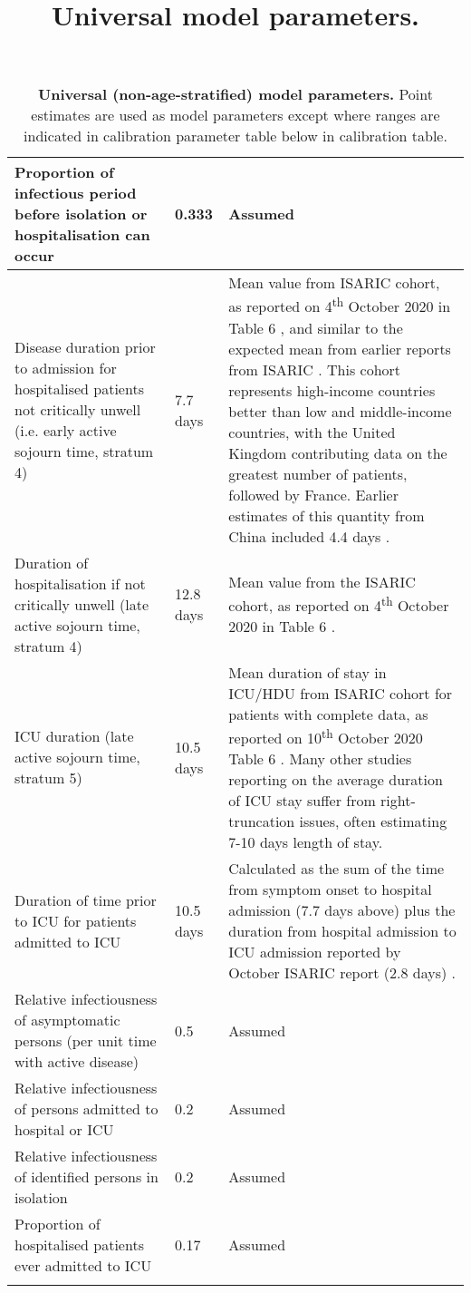 \begin{longtable}[ht]{| >{\raggedright}p{4cm} | >{\raggedright}p{3cm} | p{6.8cm} |}
    \hline
    Proportion of infectious period before isolation or hospitalisation can occur & 
    0.333 &
    Assumed \\
    \hline
    Disease duration prior to admission for hospitalised patients not critically unwell (i.e. early active sojourn time, stratum 4) &
    7.7 days &
    Mean value from ISARIC cohort, as reported on 4\textsuperscript{th} October 2020 in Table 6 \cite{RN22}, and similar to the expected mean from earlier reports from ISARIC \cite{RN16}. This cohort represents high-income countries better than low and middle-income countries, with the United Kingdom contributing data on the greatest number of patients, followed by France. Earlier estimates of this quantity from China included 4.4 days \cite{RN7}. \\
    \hline
    Duration of hospitalisation if not critically unwell (late active sojourn time, stratum 4) &
    12.8 days &
    Mean value from the ISARIC cohort, as reported on 4\textsuperscript{th} October 2020 in Table 6 \cite{RN22}. \\
    \hline
    ICU duration (late active sojourn time, stratum 5) & 10.5 days &
    Mean duration of stay in ICU/HDU from ISARIC cohort for patients with complete data, as reported on 10\textsuperscript{th} October 2020 Table 6 \cite{RN22}. Many other studies reporting on the average duration of ICU stay suffer from right-truncation issues, often estimating 7-10 days length of stay. \\
    \hline    
    Duration of time prior to ICU for patients admitted to ICU & 
    10.5 days & 
    Calculated as the sum of the time from symptom onset to hospital admission (7.7 days above) plus the duration from hospital admission to ICU admission reported by October ISARIC report (2.8 days) \cite{RN22}. \\
    \hline
    Relative infectiousness of asymptomatic persons (per unit time with active disease) & 0.5 & Assumed \\
    \hline
    Relative infectiousness of persons admitted to hospital or ICU & 0.2 & Assumed \\
    \hline
    Relative infectiousness of identified persons in isolation & 0.2 & Assumed \\
    \hline
    Proportion of hospitalised patients ever admitted to ICU & 0.17 & Assumed \\
    \hline
	\caption{\textbf{Universal (non-age-stratified) model parameters.} Point estimates are used as model parameters except where ranges are indicated in calibration parameter table below in calibration table.}
	\title{Universal model parameters.}
	\label{tab:params}
\end{longtable}

